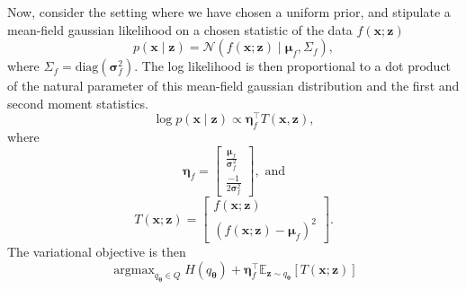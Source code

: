 \documentclass[11pt]{article}
\DeclareMathOperator*{\argmax}{argmax}
\begin{document}
Now, consider the setting where we have chosen a uniform prior, and stipulate a mean-field gaussian likelihood on a chosen statistic of the data $f(\mathbf{x}; \mathbf{z})$
\begin{equation}
p(\mathbf{x} \mid \mathbf{z}) = \mathcal{N}(f(\mathbf{x}; \mathbf{z}) \mid \bm{\mu}_f, \Sigma_f),
\end{equation}
where $\Sigma_f = \text{diag}(\bm{\sigma}_f^2)$.
The log likelihood is then proportional to a dot product of the natural parameter of this mean-field gaussian distribution and the first and second moment statistics.
\begin{equation}
\log p(\mathbf{x} \mid \mathbf{z}) \propto \bm{\eta}_f^\top T(\mathbf{x}, \mathbf{z}),
\end{equation}
where
\begin{equation}
\bm{\eta}_{f} = \begin{bmatrix} \frac{\bm{\mu}_f}{\bm{\sigma}_f^2} \\ \frac{-1}{2\bm{\sigma}_f^2} \end{bmatrix}, \text{ and}
\end{equation}
\begin{equation}
T(\mathbf{x}; \mathbf{z}) = \begin{bmatrix} f(\mathbf{x}; \mathbf{z}) \\ \left( f(\mathbf{x}; \mathbf{z}) - \bm{\mu}_f \right)^2 \end{bmatrix}.
\end{equation}
The variational objective is then
\begin{equation}
\argmax_{q_{\bm{\theta}} \in Q} H(q_{\bm{\theta}}) + \bm{\eta}_f^\top \mathbb{E}_{\mathbf{z} \sim q_{\bm{\theta}}}\left[ T(\mathbf{x}; \mathbf{z}) \right]
\end{equation}
\end{document}
